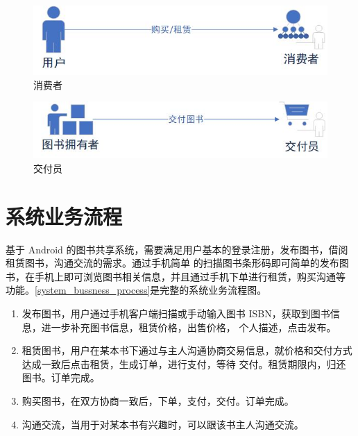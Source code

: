 \begin{figure}[h]
	\centering
	\includegraphics[scale=0.65]{Chapters/UML/costumer.jpg}
	\caption{消费者}
	\label{costumer}
\end{figure}

\begin{figure}[h]
	\centering
	\includegraphics[scale=0.65]{Chapters/UML/deliver.jpg}
	\caption{交付员}
	\label{deliver}
\end{figure}

\section{系统业务流程}
基于 Android 的图书共享系统，需要满足用户基本的登录注册，发布图书，借阅租赁图书，沟通交流的需求。通过手机简单
的扫描图书条形码即可简单的发布图书，在手机上即可浏览图书相关信息，并且通过手机下单进行租赁，购买沟通等
功能。\cref{system_bussness_process}是完整的系统业务流程图。

\begin{enumerate}
	\item 发布图书，用户通过手机客户端扫描或手动输入图书 ISBN，获取到图书信息，进一步补充图书信息，租赁价格，出售价格，
	个人描述，点击发布。
	\item 租赁图书，用户在某本书下通过与主人沟通协商交易信息，就价格和交付方式达成一致后点击租赁，生成订单，进行支付，等待
	交付。租赁期限内，归还图书。订单完成。
	\item 购买图书，在双方协商一致后，下单，支付，交付。订单完成。
	\item 沟通交流，当用于对某本书有兴趣时，可以跟该书主人沟通交流。
\end{enumerate}

